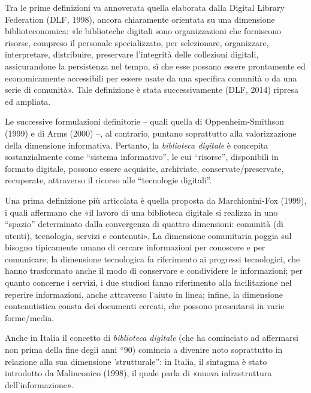 \documentclass[
  b5paper,
  twoside,
  11pt,
  chapterprefix=false,
  bibliography=totocnumbered,
  listof=flat]{scrbook}
\begin{document}
Tra le prime definizioni va annoverata quella elaborata dalla Digital
Library Federation (DLF\emph{,} 1998), ancora chiaramente orientata su una
dimensione biblioteconomica: «le biblioteche digitali sono
organizzazioni che forniscono risorse, compreso il personale
specializzato, per selezionare, organizzare, interpretare, distribuire,
preservare l'integrità delle collezioni digitali, assicurandone la
persistenza nel tempo, sì che esse possano essere prontamente ed
economicamente accessibili per essere usate da una specifica comunità o
da una serie di comunità». Tale definizione è stata successivamente
(DLF, 2014) ripresa ed ampliata.

Le successive formulazioni definitorie -- quali quella di
Oppenheim-Smithson (1999) e di Arms (2000) --, al contrario, puntano
soprattutto alla valorizzazione della dimensione informativa. Pertanto,
la \emph{biblioteca digitale} è concepita sostanzialmente come \enquote{sistema
informativo}, le cui \enquote{risorse}, disponibili in formato digitale, possono
essere acquisite, archiviate, conservate/preservate, recuperate,
attraverso il ricorso alle \enquote{tecnologie digitali}.

Una prima definizione più articolata è quella proposta da
Marchionini-Fox (1999), i quali affermano che «il lavoro di una
biblioteca digitale si realizza in uno \enquote{spazio} determinato dalla
convergenza di quattro dimensioni: comunità (di utenti), tecnologia,
servizi e contenuti». La dimensione comunitaria poggia sul bisogno
tipicamente umano di cercare informazioni per conoscere e per
comunicare; la dimensione tecnologica fa riferimento ai progressi
tecnologici, che hanno trasformato anche il modo di conservare e
condividere le informazioni; per quanto concerne i servizi, i due
studiosi fanno riferimento alla facilitazione nel reperire informazioni,
anche attraverso l'aiuto in linea; infine, la dimensione contenutistica
consta dei documenti cercati, che possono presentarsi in varie
forme/media.

Anche in Italia il concetto di \emph{biblioteca digitale} (che ha cominciato
ad affermarsi non prima della fine degli anni \enquote{90) comincia a divenire
noto soprattutto in relazione alla sua dimensione 'strutturale}: in
Italia, il sintagma è stato introdotto da Malinconico (1998), il quale
parla di «nuova infrastruttura dell'informazione».
\end{document}
